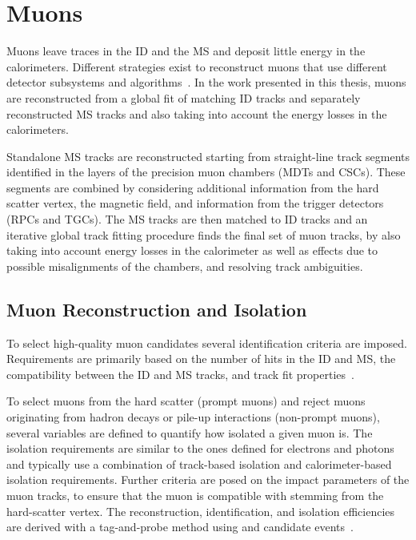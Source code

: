 
\section{Muons}
Muons leave traces in the ID and the MS and deposit little energy in the calorimeters.
Different strategies exist to reconstruct muons that use different detector subsystems and algorithms~\cite{MUON-2018-03}.
In the work presented in this thesis, muons are reconstructed from a global fit of matching ID tracks and separately reconstructed MS tracks and also taking into account the energy losses in the calorimeters.

Standalone MS tracks are reconstructed starting from straight-line track segments identified in the layers of the precision muon chambers (MDTs and CSCs).
These segments are combined by considering additional information from the hard scatter vertex, the magnetic field, and information from the trigger detectors (RPCs and TGCs). The MS tracks are then matched to ID tracks and an iterative global track fitting procedure finds the final set of muon tracks, by also taking into account energy losses in the calorimeter as well as effects due to possible misalignments of the chambers, and resolving track ambiguities.

\subsection{Muon Reconstruction and Isolation}
To select high-quality muon candidates several identification criteria are imposed.
Requirements are primarily based on the number of hits in the ID and MS, the compatibility between the ID and MS tracks, and track fit properties~\cite{MUON-2018-03}.

To select muons from the hard scatter (prompt muons) and reject muons originating from hadron decays or pile-up interactions (non-prompt muons), several variables are defined to quantify how isolated a given muon is.
The isolation requirements are similar to the ones defined for electrons and photons and typically use a combination of track-based isolation and calorimeter-based isolation requirements.
Further criteria are posed on the impact parameters of the muon tracks, to ensure that the muon is compatible with stemming from the hard-scatter vertex.
The reconstruction, identification, and isolation efficiencies are derived with a tag-and-probe method using \Jpsimumu and \Zmumu candidate events~\cite{MUON-2018-03}.


